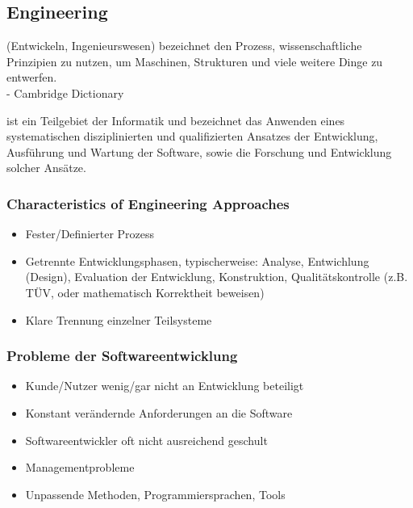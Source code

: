 \documentclass[ngerman,color=3b]{tuda_summary}
\begin{document}
\subsection{Engineering}
\begin{definition}[Engineering]
    (Entwickeln, Ingenieurswesen) bezeichnet den Prozess, wissenschaftliche Prinzipien zu nutzen, um Maschinen, Strukturen und viele weitere Dinge zu entwerfen.\\
    \phantom{a}\hfill - Cambridge Dictionary
\end{definition}
\begin{definition}
    ist ein Teilgebiet der Informatik und bezeichnet das Anwenden eines systematischen disziplinierten und qualifizierten Ansatzes der Entwicklung, Ausführung und Wartung der Software, sowie die Forschung und Entwicklung solcher Ansätze.
\end{definition}
\subsubsection{Characteristics of Engineering Approaches}
\begin{itemize}
    \item Fester/Definierter Prozess
    \item Getrennte Entwicklungsphasen, typischerweise: Analyse, Entwichlung (Design), Evaluation der Entwicklung, Konstruktion, Qualitätskontrolle (z.B. TÜV, oder mathematisch Korrektheit beweisen)
    \item Klare Trennung einzelner Teilsysteme
\end{itemize}
\subsubsection{Probleme der Softwareentwicklung}
\begin{itemize}
    \item Kunde/Nutzer wenig/gar nicht an Entwicklung beteiligt
    \item Konstant verändernde Anforderungen an die Software
    \item Softwareentwickler oft nicht ausreichend geschult
    \item Managementprobleme
    \item Unpassende Methoden, Programmiersprachen, Tools
\end{itemize}
\clearpage
\end{document}
